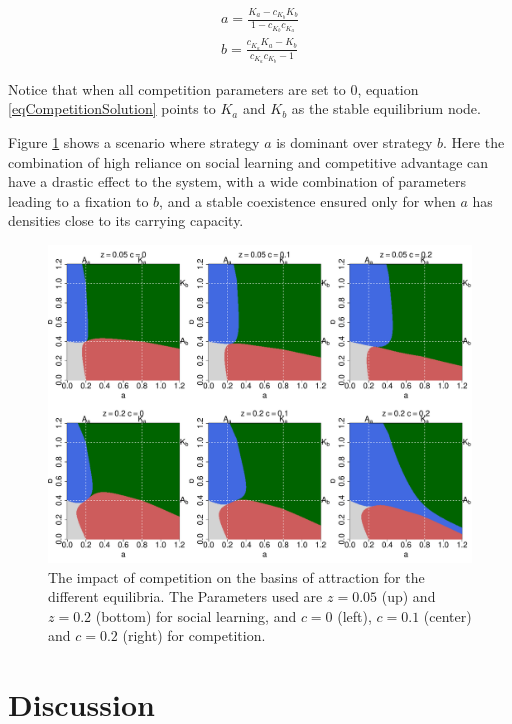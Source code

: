 \documentclass[review,authoryear]{elsarticle}
\begin{document}
\begin{equation}
\begin{aligned}
a=\frac{K_a-c_{K_b}K_b}{1-c_{K_b}c_{K_a}}\\
b=\frac{c_{K_a}K_a-K_b}{c_{K_a}c_{K_b}-1}
\label{eqCompetitionSolution}
\end{aligned}
\end{equation}

Notice that when all competition parameters are set to 0, equation \eqref{eqCompetitionSolution} points to $K_a$ and $K_b$ as the stable equilibrium node. 

Figure \ref{fig:competition} shows a scenario where strategy $a$ is dominant over strategy $b$. Here the combination of high reliance on social learning and competitive advantage can have a drastic effect to the system, with a wide combination of parameters leading to a fixation to $b$, and a stable coexistence ensured only for when $a$ has densities close to its carrying capacity.

\begin{figure}[h!]
  \centering
      \includegraphics[width=\textwidth]{./figures/figure7}
  \caption{The impact of competition on the basins of attraction for the different equilibria. The Parameters used are $z=0.05$ (up) and $z=0.2$ (bottom) for social learning, and $c=0$ (left), $c=0.1$ (center) and $c=0.2$ (right) for competition.}
    \label{fig:competition}
\end{figure}

\section{Discussion}
\end{document}
